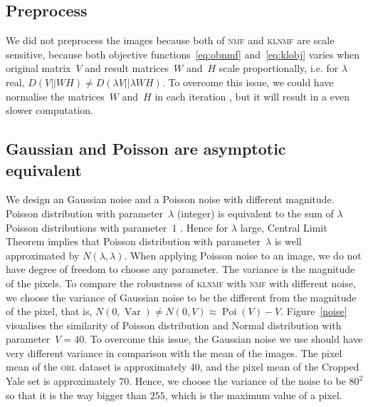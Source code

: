 \subsection{Preprocess}
We did not preprocess the images because both of \textsc{nmf} and \textsc{klnmf} are scale sensitive, because both objective functions~\eqref{eq:obnmf} and~\eqref{eq:klobj} varies when original matrix~$V$ and result matrices~$W$ and~$H$ scale proportionally, i.e. for $\lambda$ real, $D(V||WH)\neq D(\lambda V||\lambda WH)$. To overcome this issue, we could have normalise the matrices~$W$ and~$H$ in each iteration \citep{scaless}, but it will result in a even slower computation.

\subsection{Gaussian and Poisson are asymptotic equivalent}
 We design an Gaussian noise and a Poisson noise with different magnitude.
 Poisson distribution with parameter~$\lambda$ (integer) is equivalent to the sum of $\lambda$ Poisson distributions with parameter~$1$ \citep[][p. 45]{Walck:1996cca}.
 Hence for $\lambda$ large, Central Limit Theorem implies that Poisson distribution with parameter~$\lambda$ is well approximated by $N(\lambda,\lambda)$.
 When applying Poisson noise to an image, we do not have degree of freedom to choose any parameter.
 The variance is the magnitude of the pixels. To compare the robustness of \textsc{klnmf} with \textsc{nmf} with different noise, we choose the variance of Gaussian noise to be the different from the magnitude of the pixel, that is, $N(0,\operatorname{Var})\neq N(0,V)\approx \operatorname{Poi}(V)-V$.
 Figure~\ref{noise} visualises the similarity of Poisson distribution and Normal distribution with parameter~$V=40$. To overcome this issue, the Gaussian noise we use should have very different variance in comparison with the mean of the images. The pixel mean of the \textsc{orl} dataset is approximately $40$, and the pixel mean of the Cropped Yale set is approximately $70$. Hence, we choose the variance of the noise to be $80^2$ so that it is the way bigger than $255$, which is the maximum value of a pixel.
